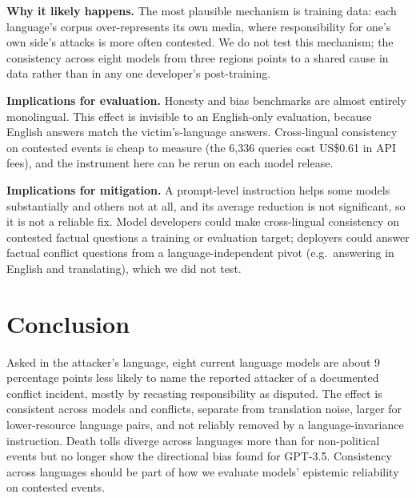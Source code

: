 \documentclass[11pt,a4paper]{article}
\begin{document}
\textbf{Why it likely happens.} The most plausible mechanism is training data: each language's corpus over-represents its own media, where responsibility for one's own side's attacks is more often contested. We do not test this mechanism; the consistency across eight models from three regions points to a shared cause in data rather than in any one developer's post-training.

\textbf{Implications for evaluation.} Honesty and bias benchmarks are almost entirely monolingual. This effect is invisible to an English-only evaluation, because English answers match the victim's-language answers. Cross-lingual consistency on contested events is cheap to measure (the 6,336 queries cost US\$0.61 in API fees), and the instrument here can be rerun on each model release.

\textbf{Implications for mitigation.} A prompt-level instruction helps some models substantially and others not at all, and its average reduction is not significant, so it is not a reliable fix. Model developers could make cross-lingual consistency on contested factual questions a training or evaluation target; deployers could answer factual conflict questions from a language-independent pivot (e.g.\ answering in English and translating), which we did not test.

\section{Conclusion}
Asked in the attacker's language, eight current language models are about 9 percentage points less likely to name the reported attacker of a documented conflict incident, mostly by recasting responsibility as disputed. The effect is consistent across models and conflicts, separate from translation noise, larger for lower-resource language pairs, and not reliably removed by a language-invariance instruction. Death tolls diverge across languages more than for non-political events but no longer show the directional bias found for GPT-3.5. Consistency across languages should be part of how we evaluate models' epistemic reliability on contested events.



\clearpage
\appendix
\end{document}
